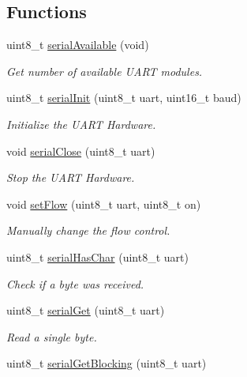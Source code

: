 \subsection*{Functions}
\begin{DoxyCompactItemize}
\item 
uint8\-\_\-t \hyperlink{group__uart_ga1ea963b291215ad9c5e8a0610f116b90}{serial\-Available} (void)
\begin{DoxyCompactList}\small\item\em Get number of available U\-A\-R\-T modules. \end{DoxyCompactList}\item 
uint8\-\_\-t \hyperlink{group__uart_ga8d59ee8831dd38c77b52deb7af9410e3}{serial\-Init} (uint8\-\_\-t uart, uint16\-\_\-t baud)
\begin{DoxyCompactList}\small\item\em Initialize the U\-A\-R\-T Hardware. \end{DoxyCompactList}\item 
void \hyperlink{group__uart_gaa16a5ecaf9e40660ded50737ff1d0a88}{serial\-Close} (uint8\-\_\-t uart)
\begin{DoxyCompactList}\small\item\em Stop the U\-A\-R\-T Hardware. \end{DoxyCompactList}\item 
void \hyperlink{group__uart_ga5d5de9e3ed5a0be11f707113cfff33f5}{set\-Flow} (uint8\-\_\-t uart, uint8\-\_\-t on)
\begin{DoxyCompactList}\small\item\em Manually change the flow control. \end{DoxyCompactList}\item 
uint8\-\_\-t \hyperlink{group__uart_ga266a54dcf3c4b85d92bf6b16bdcb5069}{serial\-Has\-Char} (uint8\-\_\-t uart)
\begin{DoxyCompactList}\small\item\em Check if a byte was received. \end{DoxyCompactList}\item 
uint8\-\_\-t \hyperlink{group__uart_gaa9d6e44600b215154c3f66193df151f6}{serial\-Get} (uint8\-\_\-t uart)
\begin{DoxyCompactList}\small\item\em Read a single byte. \end{DoxyCompactList}\item 
uint8\-\_\-t \hyperlink{group__uart_gaf7c4238a9a5e8fff64af1faf1689a5a4}{serial\-Get\-Blocking} (uint8\-\_\-t uart)

\end{DoxyCompactItemize}

